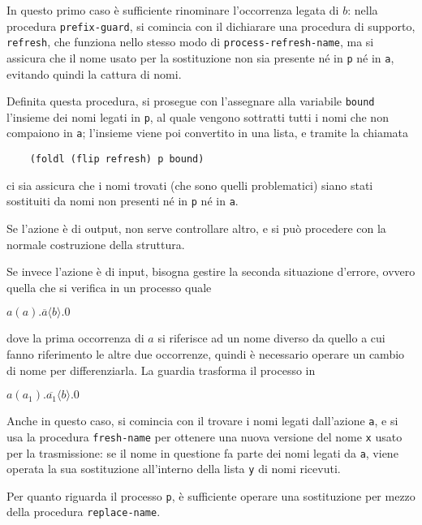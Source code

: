 In questo primo caso \`e sufficiente rinominare l'occorrenza legata di $b$:
nella procedura \lstinline{prefix-guard}, si comincia con il dichiarare una
procedura di supporto, \lstinline{refresh}, che funziona nello stesso modo
di \lstinline{process-refresh-name}, ma si assicura che il nome usato per
la sostituzione non sia presente n\'e in \lstinline{p} n\'e in
\lstinline{a}, evitando quindi la cattura di nomi.

Definita questa procedura, si prosegue con l'assegnare alla variabile
\lstinline{bound} l'insieme dei nomi legati in \lstinline{p}, al quale
vengono sottratti tutti i nomi che non compaiono in \lstinline{a};
l'insieme viene poi convertito in una lista, e tramite la chiamata

\begin{lstlisting}
    (foldl (flip refresh) p bound)
\end{lstlisting}

ci sia assicura che i nomi trovati (che sono quelli problematici) siano
stati sostituiti da nomi non presenti n\'e in \lstinline{p} n\'e in
\lstinline{a}.

Se l'azione \`e di output, non serve controllare altro, e si pu\`o
procedere con la normale costruzione della struttura.

Se invece l'azione \`e di input, bisogna gestire la seconda situazione
d'errore, ovvero quella che si verifica in un processo quale

\begin{pilisting}
$
    a(a).\overline{a}\langle b\rangle.0
$
\end{pilisting}

dove la prima occorrenza di $a$ si riferisce ad un nome diverso da
quello a cui fanno riferimento le altre due occorrenze, quindi \`e
necessario operare un cambio di nome per differenziarla. La guardia
trasforma il processo in

\begin{pilisting}
$
    a(a_1).\overline{a_1}\langle b\rangle.0
$
\end{pilisting}

Anche in questo caso, si comincia con il trovare i nomi legati dall'azione
\lstinline{a}, e si usa la procedura \lstinline{fresh-name} per ottenere
una nuova versione del nome \lstinline{x} usato per la trasmissione: se il
nome in questione fa parte dei nomi legati da \lstinline{a}, viene
operata la sua sostituzione all'interno della lista \lstinline{y} di nomi
ricevuti.

Per quanto riguarda il processo \lstinline{p}, \`e sufficiente operare una
sostituzione per mezzo della procedura \lstinline{replace-name}.

